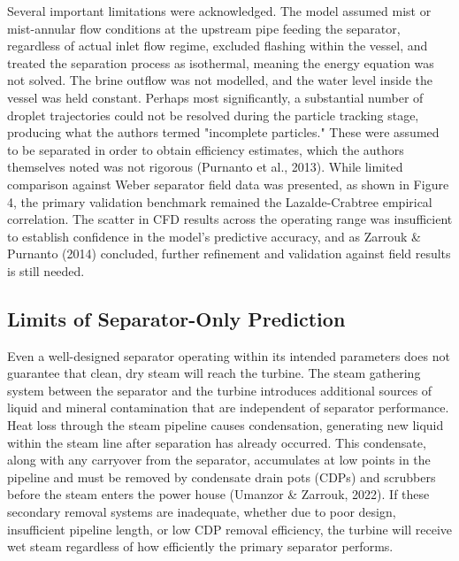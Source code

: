 Several important limitations were acknowledged. The model assumed mist or mist-annular flow conditions at the upstream pipe feeding the separator, regardless of actual inlet flow regime, excluded flashing within the vessel, and treated the separation process as isothermal, meaning the energy equation was not solved. The brine outflow was not modelled, and the water level inside the vessel was held constant. Perhaps most significantly, a substantial number of droplet trajectories could not be resolved during the particle tracking stage, producing what the authors termed "incomplete particles." These were assumed to be separated in order to obtain efficiency estimates, which the authors themselves noted was not rigorous (Purnanto et al., 2013). While limited comparison against Weber separator field data was presented, as shown in Figure 4, the primary validation benchmark remained the Lazalde-Crabtree empirical correlation. The scatter in CFD results across the operating range was insufficient to establish confidence in the model's predictive accuracy, and as Zarrouk \& Purnanto (2014) concluded, further refinement and validation against field results is still needed.

\subsection{Limits of Separator-Only Prediction}

Even a well-designed separator operating within its intended parameters does not guarantee that clean, dry steam will reach the turbine. The steam gathering system between the separator and the turbine introduces additional sources of liquid and mineral contamination that are independent of separator performance. Heat loss through the steam pipeline causes condensation, generating new liquid within the steam line after separation has already occurred. This condensate, along with any carryover from the separator, accumulates at low points in the pipeline and must be removed by condensate drain pots (CDPs) and scrubbers before the steam enters the power house (Umanzor \& Zarrouk, 2022). If these secondary removal systems are inadequate, whether due to poor design, insufficient pipeline length, or low CDP removal efficiency, the turbine will receive wet steam regardless of how efficiently the primary separator performs.

